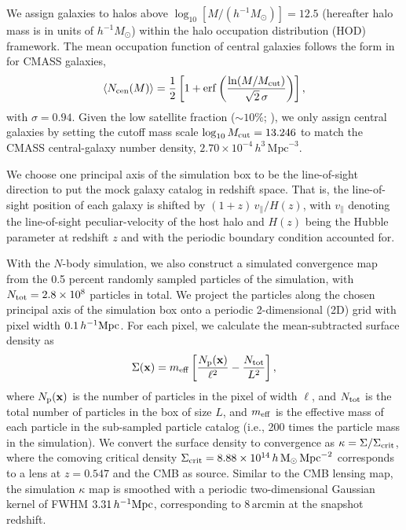 \documentclass[twocolumn,anonymous,linenumbers]{aastex701}
\newcommand{\hinvMpc}{h^{-1}{\rm Mpc}}
\newcommand{\hinvMsun}{h^{-1}M_\odot}
\begin{document}
We assign galaxies to halos above $\log_{10}[M/(\hinvMsun)]=12.5$ (hereafter halo mass is in units of $\hinvMsun$) within the halo occupation distribution (HOD) framework. The mean occupation function of central galaxies follows the form in \citet{White2011} for CMASS galaxies,
\begin{equation}
  \langle N_{\rm cen}(M)\rangle = \frac{1}{2}\left[1+\mathrm{erf}
  \left(\frac{\ln(M/M_{\rm cut})}{\sqrt{2}\,\sigma}\right)\right],
  \label{eq:hod}
\end{equation}
with $\sigma=0.94$. Given the low satellite fraction ($\sim 10\%$; \citealt{White2011}), 
we only assign central galaxies by setting the cutoff mass scale $\log_{10}M_{\rm cut}=13.246$ to match the CMASS central-galaxy number density, $2.70\times10^{-4}\,h^{3}\,\mathrm{Mpc}^{-3}$.

We choose one principal axis of the simulation box to be the line-of-sight direction to put the mock galaxy catalog in redshift space. That is, the line-of-sight position of each galaxy is shifted by $(1+z)\,v_{\parallel}/H(z)$, with $v_{\parallel}$ denoting the line-of-sight peculiar-velocity of the host halo and $H(z)$ being the Hubble parameter at redshift $z$ and with the periodic boundary condition accounted for. 

With the $N$-body simulation, we also construct a simulated convergence map from 
the 0.5 percent randomly sampled particles of the simulation, with $N_{\rm tot}=2.8\times10^{8}$ particles in total. We project the particles along the chosen 
principal axis of the simulation box onto a periodic 2-dimensional (2D) grid with 
pixel width $0.1\,\hinvMpc$. For each pixel, we calculate the mean-subtracted surface 
density as
\begin{equation}
    \Sigma(\mathbf{x})=m_{\rm eff}\left[\frac{N_{\rm p}(\mathbf{x})}{\ell^{2}}
-\frac{N_{\rm tot}}{L^{2}}\right],
\end{equation}
where $N_{\rm p}(\mathbf{x})$ is the number of particles in the pixel of width $\ell$, and $N_{\rm tot}$ is the total number of particles in the box of size $L$, and $m_{\rm eff}$ is the effective mass of each particle in the sub-sampled particle catalog (i.e., 200 times the particle mass in the simulation). We convert the surface density to convergence as $\kappa=\Sigma/\Sigma_{\rm crit}$, where the comoving critical density $\Sigma_{\rm crit}=8.88\times10^{14}\,h\,\mathrm{M}_{\odot}\,\mathrm{Mpc}^{-2}$ corresponds to a lens at $z=0.547$ and the CMB as source.
Similar to the CMB lensing map, the simulation $\kappa$ map is smoothed with a periodic two-dimensional Gaussian kernel of FWHM $3.31\,\hinvMpc$, corresponding to $8\,\mathrm{arcmin}$ at the snapshot redshift.
\end{document}
